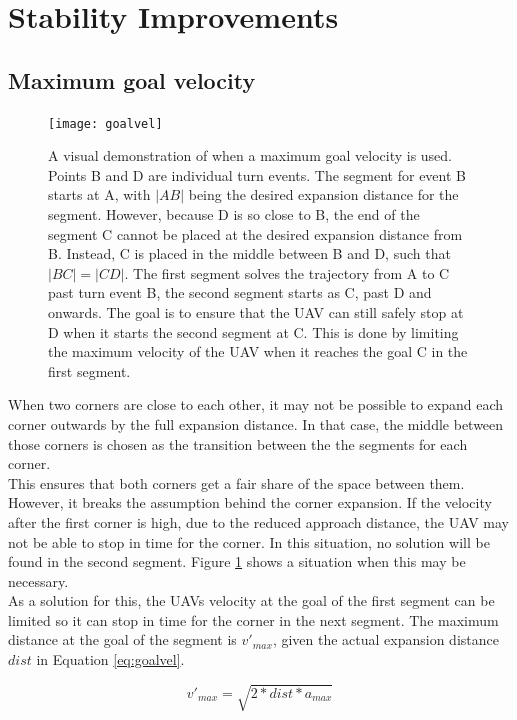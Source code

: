 \section{Stability Improvements}

\subsection{Maximum goal velocity}
\label{subsec:maxgoalvel}
\begin{figure}[]
	\centering
	\texttt{[image: goalvel]}
	\caption{A visual demonstration of when a maximum goal velocity is used. Points B and D are individual turn events. The segment for event B starts at A, with $|AB|$ being the desired expansion distance for the segment. However, because D is so close to B, the end of the segment C cannot be placed at the desired expansion distance from B. Instead, C is placed in the middle between B and D, such that $|BC|=|CD|$. The first segment solves the trajectory from A to C past turn event B, the second segment starts as C, past D and onwards. The goal is to ensure that the UAV can still safely stop at D when it starts the second segment at C. This is done by limiting the maximum velocity of the UAV when it reaches the goal C in the first segment.}
	\label{fig:max-goal-vel}
\end{figure}

When two corners are close to each other, it may not be possible to expand each corner outwards by the full expansion distance. In that case, the middle between those corners is chosen as the transition between the the segments for each corner. \\
This ensures that both corners get a fair share of the space between them. However, it breaks the assumption behind the corner expansion. If the velocity after the first corner is high, due to the reduced approach distance, the UAV may not be able to stop in time for the corner. In this situation, no solution will be found in the second segment. Figure \ref{fig:max-goal-vel} shows a situation when this may be necessary.\\
As a solution for this, the UAVs velocity at the goal of the first segment can be limited so it can stop in time for the corner in the next segment. The maximum distance at the goal of the segment is $v'_{max}$, given the actual expansion distance $dist$ in Equation \ref{eq:goalvel}. 

\begin{equation}
\label{eq:goalvel}
v'_{max} = \sqrt{2 * dist * a_{max}}
\end{equation}


